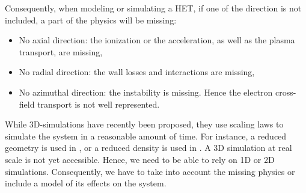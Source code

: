 Consequently, when modeling or simulating a \ac{HET}, if one of the direction is not included, a part of the physics will be missing\string:
\begin{itemize}
  \item No axial direction\string: the ionization or the acceleration, as well as the plasma transport, are missing,
  \item No radial direction\string: the wall losses and interactions are missing,
  \item No azimuthal direction\string: the instability is missing. Hence the electron cross-field transport is not well represented.
\end{itemize}

While \ac{3D}-simulations have recently been proposed, they use scaling laws to simulate the system in a reasonable amount of time\citep{taccogna2019a}.
For instance, a reduced geometry is used in \citet{taccogna2018}, or a reduced density is used in \citet{fubiani2018a}.
A \ac{3D} simulation at real scale is not yet accessible.
Hence, we need to be able to rely on \ac{1D} or \ac{2D} simulations.
Consequently, we have to take into account the missing physics or include a model of its effects on the system.
